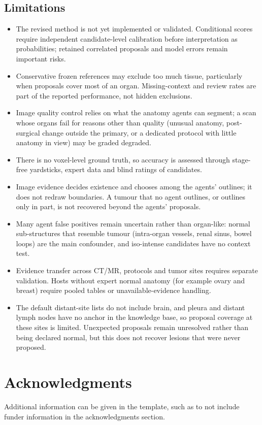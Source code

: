 \documentclass[fleqn,10pt]{olplainarticle}
\begin{document}
\subsection{Limitations}
\begin{itemize}
  \item The revised method is not yet implemented or validated. Conditional scores require independent candidate-level
  calibration before interpretation as probabilities; retained correlated proposals and model errors remain important risks.
  \item Conservative frozen references may exclude too much tissue, particularly when proposals cover most of an organ.
  Missing-context and review rates are part of the reported performance, not hidden exclusions.
  \item Image quality control relies on what the anatomy agents can segment; a scan whose organs fail for reasons other than quality (unusual anatomy, post-surgical change outside the primary, or a dedicated protocol with little anatomy in view) may be graded degraded.
  \item There is no voxel-level ground truth, so accuracy is assessed through stage-free yardsticks, expert data and
  blind ratings of candidates.
  \item Image evidence decides existence and chooses among the agents' outlines; it does not redraw boundaries. A tumour
  that no agent outlines, or outlines only in part, is not recovered beyond the agents' proposals.
  \item Many agent false positives remain uncertain rather than organ-like: normal sub-structures that resemble tumour
  (intra-organ vessels, renal sinus, bowel loops) are the main confounder, and iso-intense candidates have no context test.
  \item Evidence transfer across CT/MR, protocols and tumor sites requires separate validation. Hosts without expert normal
  anatomy (for example ovary and breast) require pooled tables or unavailable-evidence handling.
  \item The default distant-site lists do not include brain, and pleura and distant lymph nodes have no anchor in
  the knowledge base, so proposal coverage at these sites is limited. Unexpected proposals remain unresolved rather than
  being declared normal, but this does not recover lesions that were never proposed.
\end{itemize}

\section*{Acknowledgments}

Additional information can be given in the template, such as to not include funder information in the acknowledgments section.


\end{document}
